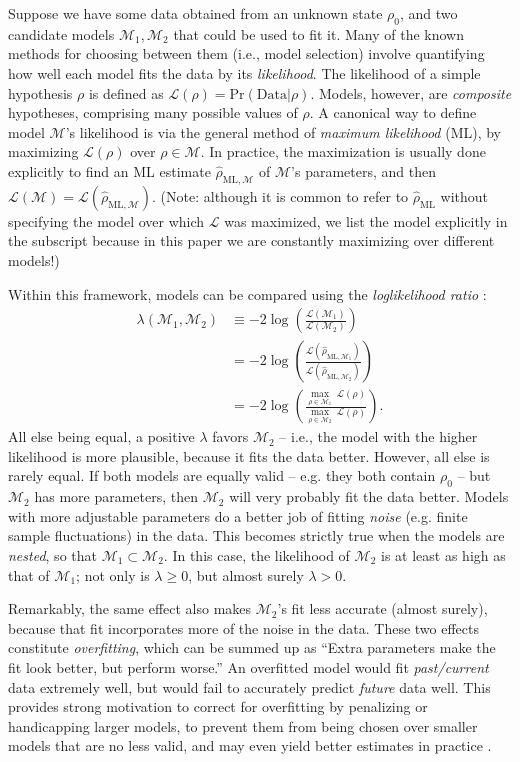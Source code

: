 \documentclass[aps,pra, twocolumn]{revtex4-1}
\newcommand{\M}{\mathcal{M}}
\newcommand{\cL}{\mathcal{L}}
\newcommand{\rhohat}{\hat{\rho}}
\newcommand{\rhoML}[1]{\rhohat_{\scriptscriptstyle{\mathrm{ML},#1}}}
\begin{document}
Suppose we have some data obtained from an unknown state $\rho_{0}$, and two candidate models $\M_{1}, \M_{2}$ that could be used to fit it.  Many of the known methods for choosing between them (i.e., model selection) involve quantifying how well each model fits the data by its \emph{likelihood}.  The likelihood of a simple hypothesis $\rho$ is defined as $\mathcal{L}(\rho) = \mathrm{Pr}(\mathrm{Data}|\rho)$.  Models, however, are \emph{composite} hypotheses, comprising many possible values of $\rho$.  A canonical way to define model $\M$'s likelihood is via the general method of \emph{maximum likelihood} (ML), by maximizing $\cL(\rho)$ over $\rho\in\M$.  In practice, the maximization is usually done explicitly to find an ML estimate $\hat{\rho}_{\mathrm{ML},\M}$ \cite{Hradil1997, JamesPRA2001, Blume-Kohout2010} of $\M$'s parameters, and then $\cL(\M) = \cL(\hat{\rho}_{\mathrm{ML},\M})$.  (Note: although it is common to refer to $\hat\rho_{\mathrm{ML}}$ without specifying the model over which $\cL$ was maximized, we list the model explicitly in the subscript because in this paper we are constantly maximizing over different models!)

Within this framework, models can be compared using the \emph{loglikelihood ratio} \cite{Neyman1933, Blume-Kohout2010, Moroder2013}:
\begin{align}
\lambda(\M_{1}, \M_{2}) &\equiv -2 \log \left(\frac{\cL(\M_{1})}{\cL(\M_{2})}\right)\\
&= -2 \log \left(\frac{\cL(\rhoML{\M_{1}})}{\cL(\rhoML{\M_{2}})}\right)\\
&= -2 \log \left(\frac{\underset{\rho \in \M_{1}}{\max}~\cL(\rho)}{\underset{\rho \in \M_{2}}{\max}~\cL(\rho)}\right).
\end{align}
All else being equal, a positive $\lambda$ favors $\M_2$ -- i.e., the model with the higher likelihood is more plausible, because it fits the data better.  However, all else is rarely equal.  If both models are equally valid -- e.g. they both contain $\rho_0$ -- but $\M_2$ has more parameters, then $\M_2$ will very probably fit the data better.  Models with more adjustable parameters do a better job of fitting \emph{noise} (e.g. finite sample fluctuations) in the data.  This becomes strictly true when the models are \emph{nested}, so that $\M_{1} \subset \M_{2}$.  In this case, the likelihood of $\M_{2}$ is at least as high as that of $\M_{1}$;  not only is $\lambda \geq 0$, but almost surely $\lambda > 0$.

Remarkably, the same effect also makes $\M_{2}$'s fit less accurate (almost surely), because that fit incorporates more of the noise in the data.  These two effects constitute \emph{overfitting}, which can be summed up as ``Extra parameters make the fit look better, but perform worse.''  An overfitted model would fit \emph{past/current} data extremely well,  but would fail to accurately predict \emph{future} data well. This provides strong motivation to correct for overfitting by penalizing or handicapping larger models, to prevent them from being chosen over smaller models that are no less valid, and may even yield better estimates in practice \cite{Akaike1974}.
\end{document}
